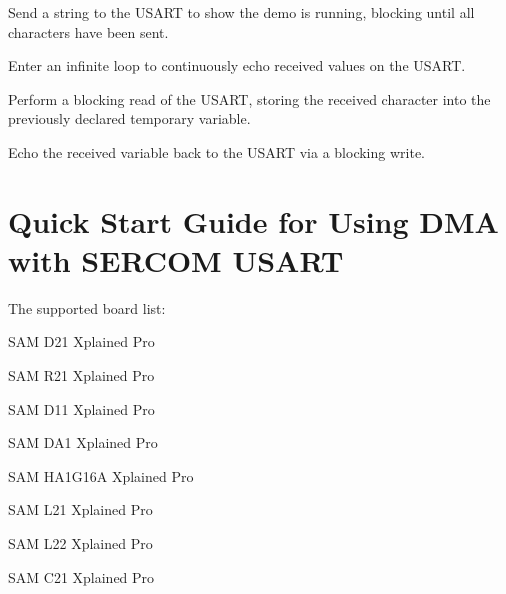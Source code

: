 \begin{DoxyEnumerate}
\item Send a string to the U\+S\+A\+RT to show the demo is running, blocking until all characters have been sent. 
\begin{DoxyCodeInclude}{0}
\end{DoxyCodeInclude}

\item Enter an infinite loop to continuously echo received values on the U\+S\+A\+RT. 
\begin{DoxyCodeInclude}{0}
\end{DoxyCodeInclude}

\item Perform a blocking read of the U\+S\+A\+RT, storing the received character into the previously declared temporary variable. 
\begin{DoxyCodeInclude}{0}
\end{DoxyCodeInclude}

\item Echo the received variable back to the U\+S\+A\+RT via a blocking write. 
\begin{DoxyCodeInclude}{0}
\end{DoxyCodeInclude}

\end{DoxyEnumerate}\hypertarget{asfdoc_sam0_sercom_usart_dma_use_case}{}\section{Quick Start Guide for Using D\+MA with S\+E\+R\+C\+OM U\+S\+A\+RT}\label{asfdoc_sam0_sercom_usart_dma_use_case}
The supported board list\+:
\begin{DoxyItemize}
\item S\+AM D21 Xplained Pro
\item S\+AM R21 Xplained Pro
\item S\+AM D11 Xplained Pro
\item S\+AM D\+A1 Xplained Pro
\item S\+AM H\+A1\+G16A Xplained Pro
\item S\+AM L21 Xplained Pro
\item S\+AM L22 Xplained Pro
\item S\+AM C21 Xplained Pro
\end{DoxyItemize}

